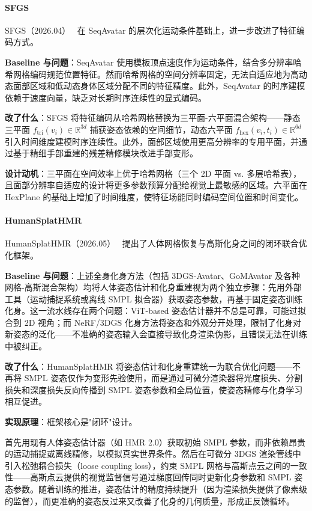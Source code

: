 \paragraph{SFGS}

SFGS（2026.04）~\cite{2604_09324} 在 SeqAvatar 的层次化运动条件基础上，进一步改进了特征编码方式。

\textbf{Baseline 与问题}：SeqAvatar 使用模板顶点速度作为运动条件，结合多分辨率哈希网格编码规范位置特征。然而哈希网格的空间分辨率固定，无法自适应地为高动态面部区域和低动态身体区域分配不同的特征精度。此外，SeqAvatar 的时序建模依赖于速度向量，缺乏对长期时序连续性的显式编码。

\textbf{改了什么}：SFGS 将特征编码从哈希网格替换为三平面-六平面混合架构——静态三平面 $f_{\text{tri}}(v_i) \in \mathbb{R}^{3d}$ 捕获姿态依赖的空间细节，动态六平面 $f_{\text{hex}}(v_i, t_i) \in \mathbb{R}^{6d}$ 引入时间维度建模时序连续性。此外，面部区域使用更高分辨率的专用平面，并通过基于精细手部重建的残差精修模块改进手部变形。

\textbf{设计动机}：三平面在空间效率上优于哈希网格（三个 2D 平面 vs. 多层哈希表），且面部分辨率自适应的设计将更多参数预算分配给视觉上最敏感的区域。六平面在 HexPlane 的基础上增加了时间维度，使特征场能同时编码空间位置和时间变化。

\paragraph{HumanSplatHMR}

HumanSplatHMR（2026.05）~\cite{2605_02784} 提出了人体网格恢复与高斯化身之间的闭环联合优化框架。

\textbf{Baseline 与问题}：上述全身化身方法（包括 3DGS-Avatar、GoMAvatar 及各种网格-高斯混合架构）均将人体姿态估计和化身重建视为两个独立步骤：先用外部工具（运动捕捉系统或离线 SMPL 拟合器）获取姿态参数，再基于固定姿态训练化身。这一流水线存在两个问题：ViT-based 姿态估计器并不总是可靠，可能过拟合到 2D 视角；而 NeRF/3DGS 化身方法将姿态和外观分开处理，限制了化身对新姿态的泛化——不准确的姿态输入会直接导致化身渲染伪影，且错误无法在训练中被纠正。

\textbf{改了什么}：HumanSplatHMR 将姿态估计和化身重建统一为联合优化问题——不再将 SMPL 姿态仅作为变形先验使用，而是通过可微分渲染器将光度损失、分割损失和深度损失反向传播到 SMPL 姿态参数和全局位置，使姿态精修与化身学习相互促进。

\textbf{实现原理}：框架核心是"闭环"设计。

首先用现有人体姿态估计器（如 HMR 2.0）获取初始 SMPL 参数，而非依赖昂贵的运动捕捉或离线精修，以模拟真实世界条件。然后在可微分 3DGS 渲染管线中引入松弛耦合损失（loose coupling loss），约束 SMPL 网格与高斯点云之间的一致性——高斯点云提供的视觉监督信号通过梯度回传同时更新化身参数和 SMPL 姿态参数。随着训练的推进，姿态估计的精度持续提升（因为渲染损失提供了像素级的监督），而更准确的姿态反过来又改善了化身的几何质量，形成正反馈循环。

